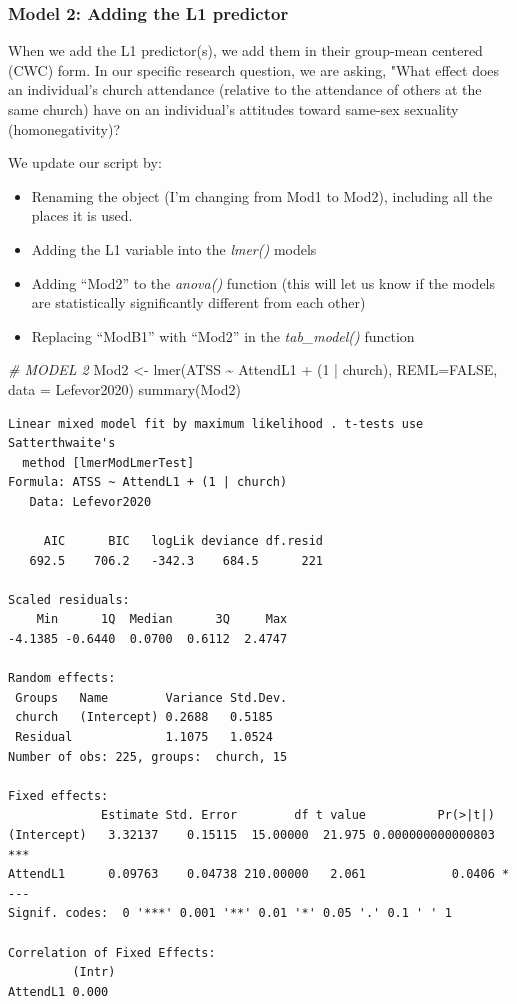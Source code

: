 \documentclass[
  english,
]{book}
\newenvironment{Shaded}{\begin{snugshade}}{\end{snugshade}}
\newcommand{\AttributeTok}[1]{\textcolor[rgb]{0.77,0.63,0.00}{#1}}
\newcommand{\CommentTok}[1]{\textcolor[rgb]{0.56,0.35,0.01}{\textit{#1}}}
\newcommand{\ConstantTok}[1]{\textcolor[rgb]{0.00,0.00,0.00}{#1}}
\newcommand{\DecValTok}[1]{\textcolor[rgb]{0.00,0.00,0.81}{#1}}
\newcommand{\FunctionTok}[1]{\textcolor[rgb]{0.00,0.00,0.00}{#1}}
\newcommand{\NormalTok}[1]{#1}
\newcommand{\OtherTok}[1]{\textcolor[rgb]{0.56,0.35,0.01}{#1}}
\newcommand{\SpecialCharTok}[1]{\textcolor[rgb]{0.00,0.00,0.00}{#1}}
\providecommand{\tightlist}{%
  \setlength{\itemsep}{0pt}\setlength{\parskip}{0pt}}
\begin{document}
\hypertarget{model-2-adding-the-l1-predictor}{%
\subsubsection{Model 2: Adding the L1 predictor}\label{model-2-adding-the-l1-predictor}}

When we add the L1 predictor(s), we add them in their group-mean centered (CWC) form. In our specific research question, we are asking, "What effect does an individual's church attendance (relative to the attendance of others at the same church) have on an individual's attitudes toward same-sex sexuality (homonegativity)?

We update our script by:

\begin{itemize}
\tightlist
\item
  Renaming the object (I'm changing from Mod1 to Mod2), including all the places it is used.
\item
  Adding the L1 variable into the \emph{lmer()} models
\item
  Adding ``Mod2'' to the \emph{anova()} function (this will let us know if the models are statistically significantly different from each other)
\item
  Replacing ``ModB1'' with ``Mod2'' in the \emph{tab\_model()} function
\end{itemize}

\begin{Shaded}
\begin{Highlighting}[]
\CommentTok{\# MODEL 2}
\NormalTok{Mod2 }\OtherTok{\textless{}{-}} \FunctionTok{lmer}\NormalTok{(ATSS }\SpecialCharTok{\textasciitilde{}}\NormalTok{ AttendL1 }\SpecialCharTok{+}\NormalTok{ (}\DecValTok{1} \SpecialCharTok{|}\NormalTok{ church), }\AttributeTok{REML=}\ConstantTok{FALSE}\NormalTok{, }\AttributeTok{data =}\NormalTok{ Lefevor2020)}
\FunctionTok{summary}\NormalTok{(Mod2)}
\end{Highlighting}
\end{Shaded}

\begin{verbatim}
Linear mixed model fit by maximum likelihood . t-tests use Satterthwaite's
  method [lmerModLmerTest]
Formula: ATSS ~ AttendL1 + (1 | church)
   Data: Lefevor2020

     AIC      BIC   logLik deviance df.resid 
   692.5    706.2   -342.3    684.5      221 

Scaled residuals: 
    Min      1Q  Median      3Q     Max 
-4.1385 -0.6440  0.0700  0.6112  2.4747 

Random effects:
 Groups   Name        Variance Std.Dev.
 church   (Intercept) 0.2688   0.5185  
 Residual             1.1075   1.0524  
Number of obs: 225, groups:  church, 15

Fixed effects:
             Estimate Std. Error        df t value          Pr(>|t|)    
(Intercept)   3.32137    0.15115  15.00000  21.975 0.000000000000803 ***
AttendL1      0.09763    0.04738 210.00000   2.061            0.0406 *  
---
Signif. codes:  0 '***' 0.001 '**' 0.01 '*' 0.05 '.' 0.1 ' ' 1

Correlation of Fixed Effects:
         (Intr)
AttendL1 0.000 
\end{verbatim}
\end{document}
